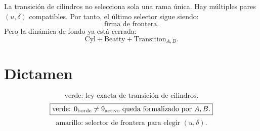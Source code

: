 \documentclass[11pt,a4paper]{article}
\begin{document}
La transición de cilindros no selecciona sola una rama única. Hay múltiples pares \((u,\delta)\) compatibles. Por tanto, el último selector sigue siendo:
\[
\boxed{
\text{firma de frontera}.
}
\]
Pero la dinámica de fondo ya está cerrada:
\[
\boxed{
\text{Cyl}+\text{Beatty}+\text{Transition}_{A,B}.
}
\]

\section{Dictamen}

\[
\boxed{
\text{verde: ley exacta de transición de cilindros.}
}
\]
\[
\boxed{
\text{verde: }0_{\rm borde}\neq9_{\rm activo}\text{ queda formalizado por }A,B.
}
\]
\[
\boxed{
\text{amarillo: selector de frontera para elegir }(u,\delta).
}
\]
\end{document}
